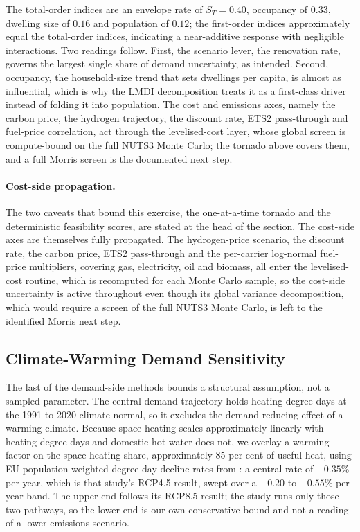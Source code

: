 The total-order indices are an envelope rate of $S_T=0.40$, occupancy of $0.33$,
dwelling size of $0.16$ and population of $0.12$; the first-order indices approximately
equal the total-order indices, indicating a near-additive response with negligible
interactions. Two readings follow. First, the scenario lever, the renovation rate,
governs the largest single share of demand uncertainty, as intended. Second, occupancy,
the household-size trend that sets dwellings per capita, is almost as influential, which
is why the LMDI decomposition treats it as a first-class driver instead of folding it
into population. The cost and emissions axes, namely the carbon price, the hydrogen
trajectory, the discount rate, ETS2 pass-through and fuel-price correlation, act through
the levelised-cost layer, whose global screen is compute-bound on the full NUTS3 Monte
Carlo; the tornado above covers them, and a full Morris screen is the documented next
step.

\paragraph{Cost-side propagation.} The two caveats that bound this exercise, the
one-at-a-time tornado and the deterministic feasibility scores, are stated at the
head of the section. The cost-side axes are themselves
fully propagated. The hydrogen-price scenario, the discount rate, the carbon price,
ETS2 pass-through and the per-carrier log-normal fuel-price multipliers, covering
gas, electricity, oil and biomass, all enter the levelised-cost routine, which is
recomputed for each Monte Carlo sample, so the cost-side
uncertainty is active throughout even though its global variance decomposition,
which would require a screen of the full NUTS3 Monte Carlo, is left to the
identified Morris next step.

\subsection{Climate-Warming Demand Sensitivity}
\label{sec:sensitivity:climate}

The last of the demand-side methods bounds a structural assumption, not a sampled
parameter. The central demand trajectory holds heating degree days at the 1991 to 2020
climate normal, so it excludes the demand-reducing effect of a warming climate. Because space heating scales approximately linearly with heating degree days and domestic hot water does not, we overlay a warming factor on the space-heating share,
approximately 85 per cent of useful heat, using EU population-weighted degree-day
decline rates from \citet{Spinoni2018degreedays}: a central rate of $-0.35\%$ per year, which is that study's RCP4.5 result, swept over a $-0.20$ to $-0.55\%$ per year band. The upper end follows its RCP8.5 result; the study runs only those two pathways, so the lower end is our own conservative bound and not a reading of a lower-emissions scenario.

